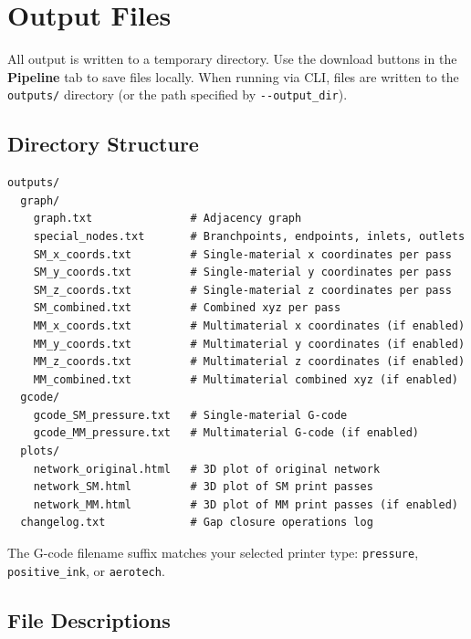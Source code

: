 \documentclass[11pt,letterpaper]{article}
\newcommand{\code}[1]{\texttt{#1}}
\newcommand{\gui}[1]{\textcolor{guicolor}{\textsf{\textbf{#1}}}}
\begin{document}
\section{Output Files}
\label{sec:outputs}

All output is written to a temporary directory. Use the download buttons in the
\gui{Pipeline} tab to save files locally. When running via CLI, files are
written to the \code{outputs/} directory (or the path specified by
\code{-{}-output\_dir}).

\subsection{Directory Structure}

\begin{lstlisting}
outputs/
  graph/
    graph.txt               # Adjacency graph
    special_nodes.txt       # Branchpoints, endpoints, inlets, outlets
    SM_x_coords.txt         # Single-material x coordinates per pass
    SM_y_coords.txt         # Single-material y coordinates per pass
    SM_z_coords.txt         # Single-material z coordinates per pass
    SM_combined.txt         # Combined xyz per pass
    MM_x_coords.txt         # Multimaterial x coordinates (if enabled)
    MM_y_coords.txt         # Multimaterial y coordinates (if enabled)
    MM_z_coords.txt         # Multimaterial z coordinates (if enabled)
    MM_combined.txt         # Multimaterial combined xyz (if enabled)
  gcode/
    gcode_SM_pressure.txt   # Single-material G-code
    gcode_MM_pressure.txt   # Multimaterial G-code (if enabled)
  plots/
    network_original.html   # 3D plot of original network
    network_SM.html         # 3D plot of SM print passes
    network_MM.html         # 3D plot of MM print passes (if enabled)
  changelog.txt             # Gap closure operations log
\end{lstlisting}

\begin{infobox}
The G-code filename suffix matches your selected printer type:
\code{pressure}, \code{positive\_ink}, or \code{aerotech}.
\end{infobox}

\subsection{File Descriptions}
\end{document}

